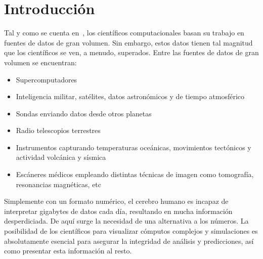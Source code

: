 
\cleardoublepage


\chapter{Introducción}
\label{makereference}

Tal y como se cuenta en~\citet{DEFANTI1991247}, los científicos computacionales
basan su trabajo en fuentes de datos de gran volumen. Sin embargo, estos datos
tienen tal magnitud que los científicos se ven, a menudo, superados. Entre las
fuentes de datos de gran volumen se encuentran:

\begin{itemize}
		\item Supercomputadores
		\item Inteligencia militar, satélites, datos astronómicos y de tiempo atmosférico
		\item Sondas enviando datos desde otros planetas
		\item Radio telescopios terrestres
		\item Instrumentos capturando temperaturas oceánicas, movimientos tectónicos y 
				actividad volcánica y sísmica
		\item Escáneres médicos empleando distintas técnicas de imagen como tomografía, 
				resonancias magnéticas, etc
\end{itemize}

Simplemente con un formato numérico, el cerebro humano es incapaz de interpretar
gigabytes de datos cada día, resultando en mucha información desperdiciada. De
aquí surge la necesidad de una alternativa a los números. La posibilidad de los
científicos para visualizar cómputos complejos y simulaciones es absolutamente
esencial para asegurar la integridad de análisis y predicciones, así como
presentar esta información al resto.\\

